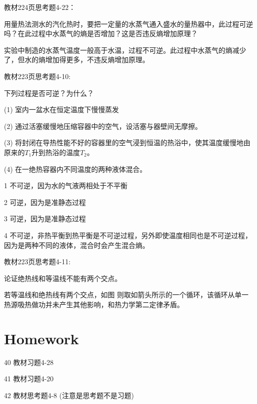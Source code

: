 \documentclass[CJK]{beamer}
\begin{document}
\begin{frame}
  \chtitle{\proid (\stwo)}
  \bch
  教材224页思考题4-22：

  用量热法测水的汽化热时，要把一定量的水蒸气通入盛水的量热器中，此过程可逆吗？在此过程中水蒸气的熵是否增加？这是否违反熵增加原理？
  \ech
\end{frame}


\begin{frame}
  \bch
  实验中制造的水蒸气温度一般高于水温，过程不可逆。此过程中水蒸气的熵减少了，但水的熵增加得更多，不违反熵增加原理。
  \ech
\end{frame}

\begin{frame}
  \chtitle{\proid (\stwo)}
  \bch
  教材223页思考题4-10:

  下列过程是否可逆？为什么？
  \bitem
\item[(1)]{室内一盆水在恒定温度下慢慢蒸发}
\item[(2)]{通过活塞缓慢地压缩容器中的空气，设活塞与器壁间无摩擦。}
\item[(3)]{将封闭在导热性能不好的容器里的空气浸到恒温的热浴中，使其温度缓慢地由原来的$T_1$升到热浴的温度$T_2$。}
\item[(4)]{在一绝热容器内不同温度的两种液体混合。}
  \eitem
  \ech
\end{frame}


\begin{frame}
  \bch
  \bitem
\item[1]{不可逆，因为水的气液两相处于不平衡}
\item[2]{可逆，因为是准静态过程}
\item[3]{可逆，因为是准静态过程}
\item[4]{不可逆，非热平衡到热平衡是不可逆过程，另外即使温度相同也是不可逆过程，因为是两种不同的液体，混合时会产生混合熵。}
  \eitem
  \ech
\end{frame}


\begin{frame}
\chtitle{\proid (\sone)}
\bch

教材223页思考题4-11:

论证绝热线和等温线不能有两个交点。
\ech
\end{frame}


\begin{frame}
\bch
若等温线和绝热线有两个交点，如图
则取如箭头所示的一个循环，该循环从单一热源吸热做功并未产生其他影响，和热力学第二定律矛盾。

\ech
\end{frame}


\section{Homework}

\begin{frame}
  \bch
  {\small 
    \bitem
\item[40]{教材习题4-28}
\item[41]{教材习题4-20}
\item[42]{教材思考题4-8 (注意是思考题不是习题)}
  \eitem
  }
  \ech
\end{frame}
\end{document}
